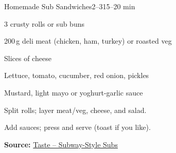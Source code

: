 \begin{recipebox}{Homemade Sub Sandwiches}{2--3}{15–20 min}
\begin{ingredients}
  \item 3 crusty rolls or sub buns
  \item 200\,g deli meat (chicken, ham, turkey) or roasted veg
  \item Slices of cheese
  \item Lettuce, tomato, cucumber, red onion, pickles
  \item Mustard, light mayo or yoghurt-garlic sauce
\end{ingredients}
\begin{method}
  \item Split rolls; layer meat/veg, cheese, and salad.
  \item Add sauces; press and serve (toast if you like).
\end{method}
\textbf{Source:} \href{https://www.taste.com.au/recipes/subway-style-subs/}{Taste – Subway-Style Subs}
\end{recipebox}
